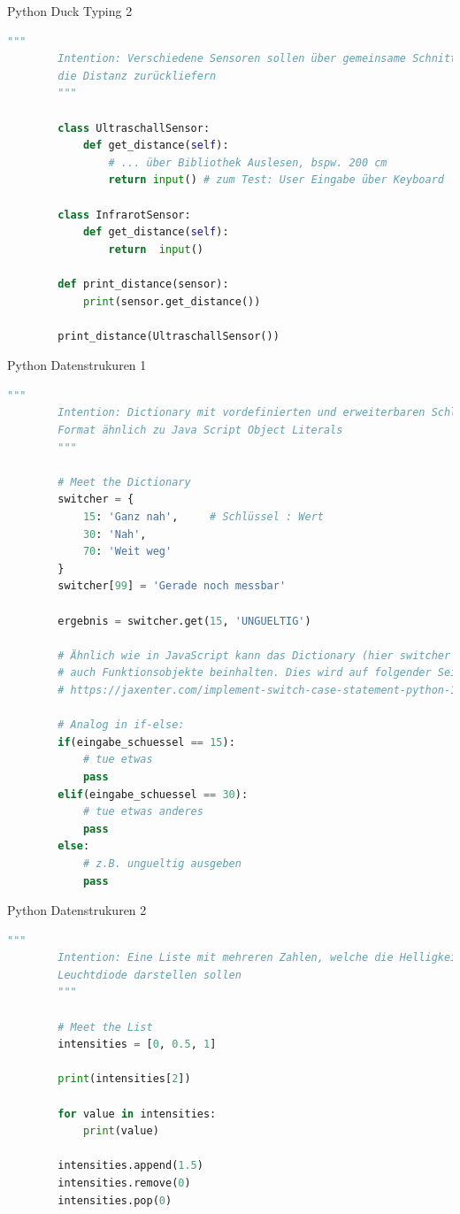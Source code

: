 \begin{frame}[fragile]{Python Duck Typing 2}
    \begin{lstlisting}[language=Python, gobble=8]
        """
        Intention: Verschiedene Sensoren sollen über gemeinsame Schnittstelle
        die Distanz zurückliefern
        """

        class UltraschallSensor:
            def get_distance(self):
                # ... über Bibliothek Auslesen, bspw. 200 cm
                return input() # zum Test: User Eingabe über Keyboard

        class InfrarotSensor:
            def get_distance(self):
                return  input()

        def print_distance(sensor):
            print(sensor.get_distance())

        print_distance(UltraschallSensor())
    \end{lstlisting}
\end{frame}

\begin{frame}[fragile]{Python Datenstrukuren 1}
    \begin{lstlisting}[language=Python, gobble=8]
        """
        Intention: Dictionary mit vordefinierten und erweiterbaren Schlüsseln,
        Format ähnlich zu Java Script Object Literals
        """

        # Meet the Dictionary
        switcher = {
            15: 'Ganz nah',     # Schlüssel : Wert
            30: 'Nah',
            70: 'Weit weg'
        }
        switcher[99] = 'Gerade noch messbar'

        ergebnis = switcher.get(15, 'UNGUELTIG')

        # Ähnlich wie in JavaScript kann das Dictionary (hier switcher genannt)
        # auch Funktionsobjekte beinhalten. Dies wird auf folgender Seite erklärt:
        # https://jaxenter.com/implement-switch-case-statement-python-138315.html

        # Analog in if-else:
        if(eingabe_schuessel == 15):
            # tue etwas
            pass
        elif(eingabe_schuessel == 30):
            # tue etwas anderes
            pass
        else:
            # z.B. ungueltig ausgeben
            pass
    \end{lstlisting}
\end{frame}

\begin{frame}[fragile]{Python Datenstrukuren 2}
    \begin{lstlisting}[language=Python, gobble=8]
        """
        Intention: Eine Liste mit mehreren Zahlen, welche die Helligkeit einer
        Leuchtdiode darstellen sollen
        """

        # Meet the List
        intensities = [0, 0.5, 1]

        print(intensities[2])

        for value in intensities:
            print(value)

        intensities.append(1.5)
        intensities.remove(0)
        intensities.pop(0)
    \end{lstlisting}
\end{frame}

